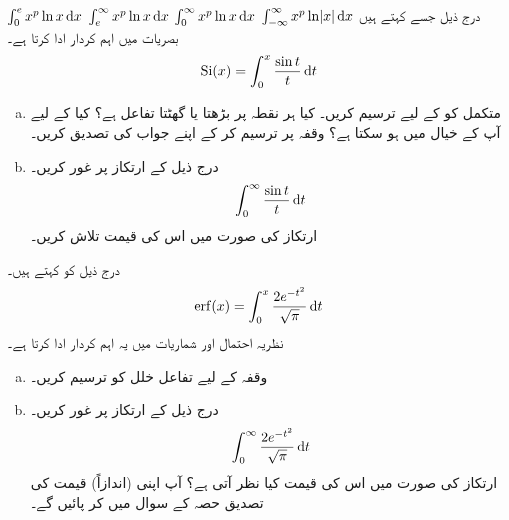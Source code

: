 $\int_0^e x^p\ln x\dif x$
$\int_e^{\infty}x^p\ln x\dif x$
$\int_0^{\infty}x^p\ln x\dif x$
$\int_{-\infty}^{\infty}x^p\ln\abs{x}\dif x$
درج ذیل  جسے  کہتے ہیں بصریات میں اہم کردار ادا کرتا ہے۔
\begin{align*}
\kSi(x)=\int_0^x\frac{\sin t}{t}\dif t
\end{align*}
%
\begin{enumerate}[a.]
\item
متکمل  کو  کے لیے ترسیم کریں۔ کیا  ہر نقطہ پر بڑھتا یا  گھٹتا تفاعل ہے؟ کیا  کے لیے آپ کے خیال میں  ہو سکتا ہے؟ وقفہ  پر  ترسیم کر کے اپنے جواب کی تصدیق کریں۔
\item
درج ذیل کے ارتکاز پر غور کریں۔
\begin{align*}
\int_0^{\infty}\frac{\sin t}{t}\dif t
\end{align*}
ارتکاز کی صورت میں اس کی قیمت تلاش کریں۔
\end{enumerate}
درج ذیل کو  کہتے ہیں۔
\begin{align*}
\erf(x)=\int_0^x\frac{2e^{-t^2}}{\sqrt{\pi}}\dif t
\end{align*}
نظریہ احتمال اور شماریات میں یہ اہم کردار ادا کرتا ہے۔
\begin{enumerate}[a.]
\item
وقفہ  کے لیے تفاعل خلل کو ترسیم کریں۔
\item
درج ذیل کے ارتکاز پر غور کریں۔
\begin{align*}
\int_0^{\infty}\frac{2e^{-t^2}}{\sqrt{\pi}}\dif t
\end{align*}
ارتکاز کی صورت میں اس کی قیمت کیا نظر آتی ہے؟ آپ اپنی (اندازاً) قیمت کی  تصدیق حصہ  کے سوال  میں کر پائیں گے۔
\end{enumerate}
